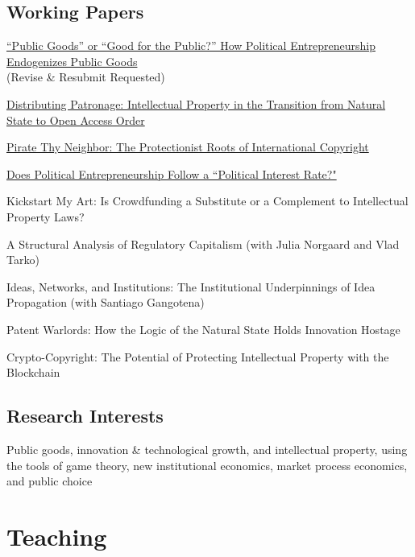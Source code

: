 \documentclass[]{article}
\renewenvironment{itemize}{
  \begin{list}{}{
    \setlength{\leftmargin}{1.5em}
  }
}{
  \end{list}
}
\begin{document}
\subsection*{Working Papers}

\begin{itemize}
    \item \href{http://ssrn.com/abstract=2488655}{``Public Goods'' or ``Good for the Public?'' How Political Entrepreneurship Endogenizes Public Goods} \\(Revise \& Resubmit Requested)    
    \item \href{http://papers.ssrn.com/abstract=2499621}{Distributing Patronage: Intellectual Property in the Transition from Natural State to Open Access Order}
    \item \href{http://papers.ssrn.com/sol3/papers.cfm?abstract_id=2564232}{Pirate Thy Neighbor: The Protectionist Roots of International Copyright}
    \item  \href{http://ssrn.com/abstract=2399726}{Does Political Entrepreneurship Follow a ``Political Interest Rate?"}
    \item Kickstart My Art: Is Crowdfunding a Substitute or a Complement to Intellectual Property Laws? 
    \item A Structural Analysis of Regulatory Capitalism (with Julia Norgaard and Vlad Tarko)
    \item Ideas, Networks, and Institutions: The Institutional Underpinnings of Idea Propagation (with Santiago Gangotena) 
    \item Patent Warlords: How the Logic of the Natural State Holds Innovation Hostage
    \item Crypto-Copyright: The Potential of Protecting Intellectual Property with the Blockchain
\end{itemize}

\subsection*{Research Interests}

Public goods, innovation \& technological growth, and intellectual
property, using the tools of game theory, new institutional economics,
market process economics, and public choice

\section*{Teaching}
\end{document}
